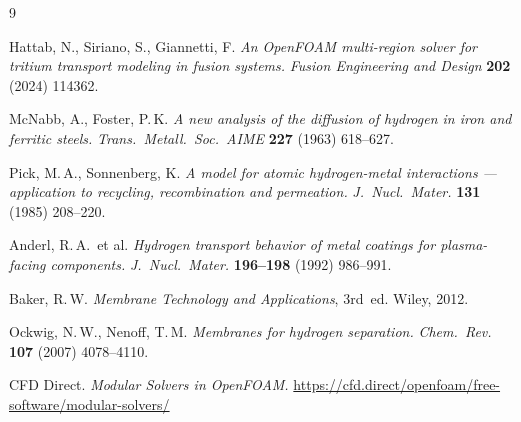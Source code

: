 \documentclass[11pt,a4paper]{article}
\begin{document}
\begin{thebibliography}{9}

  Hattab, N., Siriano, S., Giannetti, F.
  \textit{An OpenFOAM multi-region solver for tritium transport modeling
  in fusion systems.}
  \textit{Fusion Engineering and Design} \textbf{202} (2024) 114362.

  McNabb, A., Foster, P.\,K.
  \textit{A new analysis of the diffusion of hydrogen in iron and ferritic steels.}
  \textit{Trans.\ Metall.\ Soc.\ AIME} \textbf{227} (1963) 618--627.

  Pick, M.\,A., Sonnenberg, K.
  \textit{A model for atomic hydrogen-metal interactions --- application to
  recycling, recombination and permeation.}
  \textit{J.\ Nucl.\ Mater.} \textbf{131} (1985) 208--220.

  Anderl, R.\,A.\ et al.
  \textit{Hydrogen transport behavior of metal coatings for plasma-facing components.}
  \textit{J.\ Nucl.\ Mater.} \textbf{196--198} (1992) 986--991.

  Baker, R.\,W.
  \textit{Membrane Technology and Applications}, 3rd~ed.
  Wiley, 2012.

  Ockwig, N.\,W., Nenoff, T.\,M.
  \textit{Membranes for hydrogen separation.}
  \textit{Chem.\ Rev.} \textbf{107} (2007) 4078--4110.

  CFD Direct.
  \textit{Modular Solvers in OpenFOAM.}
  \url{https://cfd.direct/openfoam/free-software/modular-solvers/}

\end{thebibliography}
\end{document}
